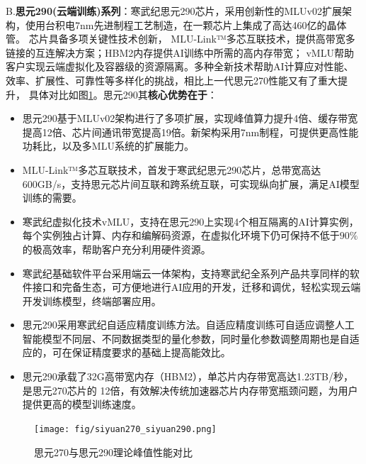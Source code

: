 B.\textbf{思元290(云端训练)系列}：寒武纪思元290芯片，采用创新性的MLUv02扩展架构，使用台积电7nm先进制程工艺制造，在一颗芯片上集成了高达460亿的晶体管。
芯片具备多项关键性技术创新， MLU-Link™多芯互联技术，提供高带宽多链接的互连解决方案；HBM2内存提供AI训练中所需的高内存带宽；
vMLU帮助客户实现云端虚拟化及容器级的资源隔离。多种全新技术帮助AI计算应对性能、效率、扩展性、可靠性等多样化的挑战，相比上一代思元270性能又有了重大提升，
具体对比如图\ref{siyuan270_siyuan290}。思元290其\textbf{核心优势在于}：
\begin{itemize}
  \item 思元290基于MLUv02架构进行了多项扩展，实现峰值算力提升4倍、缓存带宽提高12倍、芯片间通讯带宽提高19倍。新架构采用7nm制程，可提供更高性能功耗比，以及多MLU系统的扩展能力。
  \item MLU-Link™多芯互联技术，首发于寒武纪思元290芯片，总带宽高达600GB/s，支持思元芯片间互联和跨系统互联，可实现纵向扩展，满足AI模型训练的需要。
  \item 寒武纪虚拟化技术vMLU，支持在思元290上实现4个相互隔离的AI计算实例，每个实例独占计算、内存和编解码资源，在虚拟化环境下仍可保持不低于$90\%$的极高效率，帮助客户充分利用硬件资源。
  \item 寒武纪基础软件平台采用端云一体架构，支持寒武纪全系列产品共享同样的软件接口和完备生态，可方便地进行AI应用的开发，迁移和调优，轻松实现云端开发训练模型，终端部署应用。
  \item 思元290采用寒武纪自适应精度训练方法。自适应精度训练可自适应调整人工智能模型不同层、不同数据类型的量化参数，同时量化参数调整周期也是自适应的，可在保证精度要求的基础上提高能效比。 
  \item 思元290承载了32G高带宽内存（HBM2），单芯片内存带宽高达1.23TB/秒，是思元270芯片的 12倍，有效解决传统加速器芯片内存带宽瓶颈问题，为用户提供更高的模型训练速度。
\end{itemize}

\begin{figure}[!htb]
  \centering
  \texttt{[image: fig/siyuan270\_siyuan290.png]}
  \caption{思元270与思元290理论峰值性能对比}
  \label{siyuan270_siyuan290}
\end{figure}

